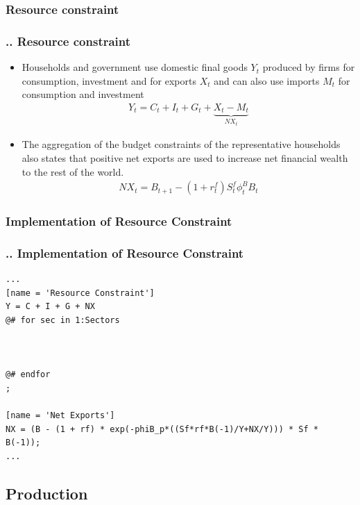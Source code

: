 \documentclass[11pt,aspectratio=169]{beamer}
\begin{document}
\subsubsection{Resource constraint}
\begin{frame}
\frametitle{{\thesection.\thesubsection.\thesubsubsection} Resource constraint}
\scriptsize
\begin{itemize}
\item Households and government use domestic final goods $Y_t$ produced by firms for consumption, investment and for exports $X_{t}$ and can also use imports $M_t$ for consumption and investment
\begin{align}
Y_{t} = C_{t} + I_{t} + G_{t} + \underbrace{X_{t} - M_{t}}_{NX_{t}}
\end{align}
\item The aggregation of the budget constraints of the representative households also states that positive net exports are used to increase net financial wealth to the rest of the world.
\begin{align}
NX_t = B_{t+1} - (1 + r^{f}_{t}) S^{f}_{t} \phi^B_{t} B_{t}
\end{align}
\end{itemize}
\end{frame}

\subsubsection{Implementation of Resource Constraint}
\begin{frame}[fragile]
\frametitle{{\thesection.\thesubsection.\thesubsubsection} Implementation of Resource Constraint}

\begin{lstlisting}[frame = single]
...
[name = 'Resource Constraint']
Y = C + I + G + NX
@# for sec in 1:Sectors



@# endfor
;

[name = 'Net Exports']
NX = (B - (1 + rf) * exp(-phiB_p*((Sf*rf*B(-1)/Y+NX/Y))) * Sf * B(-1));
...
\end{lstlisting}
\end{frame}
%
\subsection{Production}
\end{document}
